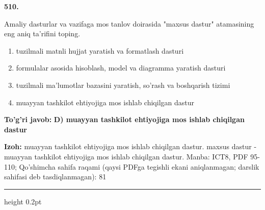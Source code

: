 \documentclass[10pt,a4paper]{article}
\begin{document}
{\bfseries\sffamily\color{ink} 510.}
\par
Amaliy dasturlar va vazifaga mos tanlov doirasida "maxsus dastur" atamasining eng aniq ta'rifini toping.
\begin{enumerate}[label=\Alph*),leftmargin=9mm]
\item tuzilmali matnli hujjat yaratish va formatlash dasturi
\item formulalar asosida hisoblash, model va diagramma yaratish dasturi
\item tuzilmali ma'lumotlar bazasini yaratish, so'rash va boshqarish tizimi
\item muayyan tashkilot ehtiyojiga mos ishlab chiqilgan dastur
\end{enumerate}
\begin{tcolorbox}[enhanced,breakable,colback=teal!4,colframe=teal!60!black,boxrule=0.45pt,arc=1.2mm,left=2.7mm,right=2.7mm,top=1.8mm,bottom=1.8mm,before skip=2mm,after skip=2mm]
{\bfseries\sffamily\color{teal}To'g'ri javob:} \textbf{D) muayyan tashkilot ehtiyojiga mos ishlab chiqilgan dastur}
\par\smallskip
{\bfseries Izoh:} muayyan tashkilot ehtiyojiga mos ishlab chiqilgan dastur. maxsus dastur - muayyan tashkilot ehtiyojiga mos ishlab chiqilgan dastur. Manba: ICT8, PDF 95-110; Qo'shimcha sahifa raqami (qaysi PDFga tegishli ekani aniqlanmagan; darslik sahifasi deb tasdiqlanmagan): 81
\end{tcolorbox}
\vspace{2mm}\hrule height 0.2pt\vspace{3mm}
\end{document}
